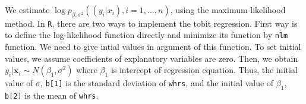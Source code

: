 \documentclass[
  12pt,
]{article}
\newenvironment{Shaded}{\begin{snugshade}}{\end{snugshade}}
\newcommand{\ControlFlowTok}[1]{\textcolor[rgb]{0.13,0.29,0.53}{\textbf{#1}}}
\newcommand{\DecValTok}[1]{\textcolor[rgb]{0.00,0.00,0.81}{#1}}
\newcommand{\KeywordTok}[1]{\textcolor[rgb]{0.13,0.29,0.53}{\textbf{#1}}}
\newcommand{\NormalTok}[1]{#1}
\newcommand{\OperatorTok}[1]{\textcolor[rgb]{0.81,0.36,0.00}{\textbf{#1}}}
\newcommand{\StringTok}[1]{\textcolor[rgb]{0.31,0.60,0.02}{#1}}
\begin{document}
We estimate \(\log p_{\beta, \sigma^2}((y_i | x_i), i = 1, \ldots, n)\),
using the maximum likelihood method. In \texttt{R}, there are two ways
to implement the tobit regression. First way is to define the
log-likelihood function directly and minimize its function by
\texttt{nlm} function. We need to give intial values in argument of this
function. To set initial values, we assume coefficients of explanatory
variables are zero. Then, we obtain
\(y_i | \mathbf{x}_i \sim N(\beta_1, \sigma^2)\) where \(\beta_1\) is
intercept of regression equation. Thus, the initial value of \(\sigma\),
\texttt{b{[}1{]}} is the standard deviation of \texttt{whrs}, and the
initial value of \(\beta_1\), \texttt{b{[}2{]}} is the mean of
\texttt{whrs}.

\begin{Shaded}
\end{Shaded}
\end{document}
